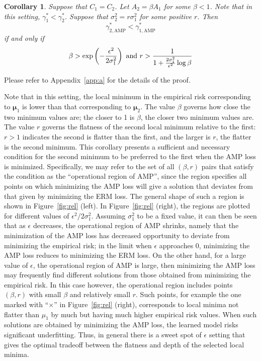 \documentclass[final]{cvpr}
\newtheorem{cor}{Corollary}
\begin{document}
\begin{cor}\label{cor2}
Suppose that $C_1=C_2$. Let $A_2=\beta A_1$ for some $\beta<1$. Note that in this setting, $\gamma^\ast_1<\gamma^\ast_2$. Suppose that $\sigma_2^2=r\sigma^2_1$ for some positive $r$. Then 
\begin{equation}
\gamma^\ast_{2,\mathrm{AMP}}<\gamma^\ast_{1,\mathrm{AMP}}
\end{equation}
if and only if
\begin{equation}
\beta > \exp\left(-\frac{\epsilon^2}{2\sigma^2_1}\right) ~ {\rm and} ~
r > \frac{1}{1+\frac{2\sigma_1^2}{\epsilon^2}\log\beta}
\end{equation}
\end{cor}
Please refer to Appendix~\ref{app:a} for the details of the proof.

Note that in this setting, the local minimum in the empirical risk corresponding to $\boldsymbol{\mu}_1$ is lower than that corresponding to $\boldsymbol{\mu}_2$. The value $\beta$ governs how close the two minimum values are; the closer to 1 is $\beta$, the closer two minimum values are. The value $r$ governs the flatness of the second local minimum relative to the first: $r>1$ indicates the second is flatter than the first, and the larger is $r$, the flatter is the second minimum. This corollary presents a sufficient and necessary condition for the second minimum to be preferred to the first when the AMP loss is minimized. Specifically, we may refer to the set of all $(\beta,r)$ pairs that satisfy the condition as the ``operational region of AMP'', since the region specifies all points on which minimizing the AMP loss will give a solution that deviates from that given by minimizing the ERM loss. The general shape of such a region is shown in Figure~\ref{fig:rel} (left). In Figure~\ref{fig:rel} (right), the regions are plotted for different values of $\epsilon^2/2\sigma_1^2$. Assuming $\sigma_1^2$ to be a fixed value, it can then be seen that as $\epsilon$ decreases, the operational region of AMP shrinks, namely that the minimization of the AMP loss has decreased opportunity to deviate from minimizing the empirical risk; in the limit when $\epsilon$ approaches 0, minimizing the AMP loss reduces to minimizing the ERM loss. On the other hand, for a large value of $\epsilon$, the operational region of AMP is large, then minimizing the AMP loss may frequently find different solutions from those obtained from minimizing the empirical risk.  In this case however, the operational region includes points $(\beta,r)$ with small $\beta$ and relatively small $r$. Such points, for example the one marked with ``$\boldsymbol{\times}$'' in Figure~\ref{fig:rel} (right), corresponds to local minima not flatter than $\mu_1$ by much but having much higher empirical risk values. When such solutions are obtained by minimizing the AMP loss, the learned model risks significant underfitting. Thus, in general there is a sweet spot of $\epsilon$ setting that gives the optimal tradeoff between the flatness and depth of the selected local minima.
\end{document}
